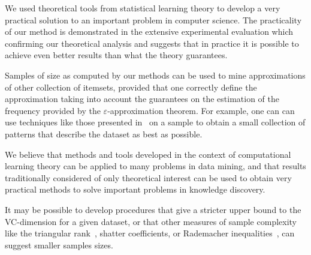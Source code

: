 We used theoretical tools from statistical learning theory to develop a very
practical solution to an important problem in computer science. The practicality
of our method is demonstrated in the extensive experimental evaluation which
confirming our theoretical analysis and suggests that in practice it is possible
to achieve even better results than what the theory guarantees. 

Samples of size as computed by our methods can be used to mine approximations
of other collection of itemsets, provided that one correctly define the
approximation taking into account the guarantees on the estimation of the
frequency provided by the $\varepsilon$-approximation theorem. For example, one
can can use techniques like those presented in~\citep{MampaeyTV11} on a sample
to obtain a small collection of patterns that describe the dataset as best as
possible.

We believe that methods and tools developed in the context of computational
learning theory can be applied to many problems in data mining, and that results
traditionally considered of only theoretical interest can be used to obtain very
practical methods to solve important problems in knowledge discovery.

It may be possible to develop procedures that give a stricter upper bound to the
VC-dimension for a given dataset, or that other measures of sample complexity
like the triangular rank~\citep{NewmanR12}, shatter coefficients, or Rademacher
inequalities~\citep{BoucheronBL05}, can suggest smaller samples sizes. 



